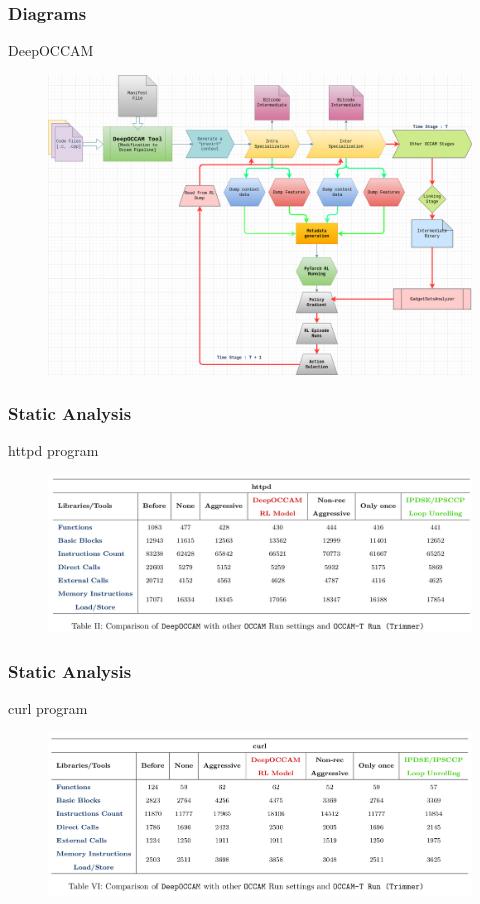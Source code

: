 \documentclass[9pt]{beamer}
\begin{document}
\begin{frame}[fragile]
	\frametitle{Diagrams}
	\begin{block}{DeepOCCAM}
		\begin{figure}[H]
			\centering
		\includegraphics[width=0.8\linewidth]{imgs/deepoccam-pipeline.png}
		\label{fig:plant}
		\end{figure}
	\end{block}
\end{frame}
\begin{frame}[fragile]
	\frametitle{Static Analysis}
	\begin{block}{httpd program}
		\begin{figure}[H]
			\centering
			\includegraphics[width=0.8\linewidth]{imgs/static_analysis_1.png}
			\label{fig:plant}
		\end{figure}
	\end{block}
\end{frame}
\begin{frame}[fragile]
	\frametitle{Static Analysis}
	\begin{block}{curl program}
		\begin{figure}[H]
			\centering
			\includegraphics[width=0.8\linewidth]{imgs/static_analysis_2.png}
			\label{fig:plant}
		\end{figure}
	\end{block}
\end{frame}
\end{document}
